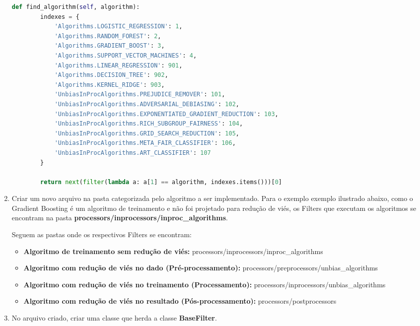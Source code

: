 \documentclass[Portugues,Final]{ic-tese-v3}
\begin{document}
\begin{enumerate}
\begin{lstlisting}[language=Python, label=cod:FindAlgorithm]
    def find_algorithm(self, algorithm):
        indexes = {
            'Algorithms.LOGISTIC_REGRESSION': 1,
            'Algorithms.RANDOM_FOREST': 2,
            'Algorithms.GRADIENT_BOOST': 3,
            'Algorithms.SUPPORT_VECTOR_MACHINES': 4,
            'Algorithms.LINEAR_REGRESSION': 901,
            'Algorithms.DECISION_TREE': 902,
            'Algorithms.KERNEL_RIDGE': 903,
            'UnbiasInProcAlgorithms.PREJUDICE_REMOVER': 101,
            'UnbiasInProcAlgorithms.ADVERSARIAL_DEBIASING': 102,
            'UnbiasInProcAlgorithms.EXPONENTIATED_GRADIENT_REDUCTION': 103,
            'UnbiasInProcAlgorithms.RICH_SUBGROUP_FAIRNESS': 104,
            'UnbiasInProcAlgorithms.GRID_SEARCH_REDUCTION': 105,
            'UnbiasInProcAlgorithms.META_FAIR_CLASSIFIER': 106,
            'UnbiasInProcAlgorithms.ART_CLASSIFIER': 107
        }

        return next(filter(lambda a: a[1] == algorithm, indexes.items()))[0]
\end{lstlisting}

\item Criar um novo arquivo na pasta categorizada pelo algoritmo a ser implementado. Para o exemplo exemplo ilustrado abaixo, como o Gradient Boosting é um algoritmo de treinamento e não foi projetado para redução de viés, os Filters que executam os algoritmos se encontram na pasta \textbf{processors/inprocessors/inproc\_algorithms}.

Seguem as pastas onde os respectivos Filters se encontram:

\begin{itemize}
\item \textbf{Algoritmo de treinamento sem redução de viés:} processors/inprocessors/inproc\_algorithms
\item \textbf{Algoritmo com redução de viés no dado (Pré-processamento):} processors/preprocessors/unbias\_algorithms
\item \textbf{Algoritmo com redução de viés no treinamento (Processamento):} processors/inprocessors/unbias\_algorithms
\item \textbf{Algoritmo com redução de viés no resultado (Pós-processamento):} processors/postprocessors
\end{itemize}

\item No arquivo criado, criar uma classe que herda a classe \textbf{BaseFilter}.


\end{enumerate}
\end{document}
